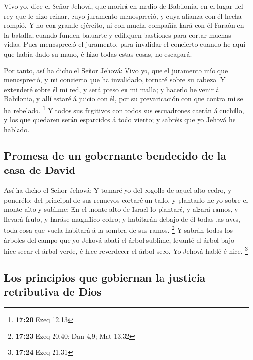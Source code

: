  Vivo yo, dice el Señor Jehová, que morirá en medio de
Babilonia, en el lugar del rey que le hizo reinar, cuyo juramento
menospreció, y cuya alianza con él hecha rompió.  Y no con
grande ejército, ni con mucha compañía hará con él Faraón en la batalla,
cuando funden baluarte y edifiquen bastiones para cortar muchas vidas.
 Pues menospreció el juramento, para invalidar el concierto
cuando he aquí que había dado su mano, é hizo todas estas cosas, no
escapará.

 Por tanto, así ha dicho el Señor Jehová: Vivo yo, que el
juramento mío que menospreció, y mi concierto que ha invalidado, tornaré
sobre su cabeza.  Y extenderé sobre él mi red, y será preso
en mi malla; y hacerlo he venir á Babilonia, y allí estaré á juicio con
él, por su prevaricación con que contra mí se ha rebelado. \footnote{\textbf{17:20}
  Ezeq 12,13}  Y todos sus fugitivos con todos sus
escuadrones caerán á cuchillo, y los que quedaren serán esparcidos á
todo viento; y sabréis que yo Jehová he hablado.

\hypertarget{promesa-de-un-gobernante-bendecido-de-la-casa-de-david}{%
\subsection{Promesa de un gobernante bendecido de la casa de
David}\label{promesa-de-un-gobernante-bendecido-de-la-casa-de-david}}

 Así ha dicho el Señor Jehová: Y tomaré yo del cogollo de
aquel alto cedro, y pondrélo; del principal de sus renuevos cortaré un
tallo, y plantarlo he yo sobre el monte alto y sublime;  En
el monte alto de Israel lo plantaré, y alzará ramos, y llevará fruto, y
haráse magnífico cedro; y habitarán debajo de él todas las aves, toda
cosa que vuela habitará á la sombra de sus ramos. \footnote{\textbf{17:23}
  Ezeq 20,40; Dan 4,9; Mat 13,32}  Y sabrán todos los
árboles del campo que yo Jehová abatí el árbol sublime, levanté el árbol
bajo, hice secar el árbol verde, é hice reverdecer el árbol seco. Yo
Jehová hablé é hice. \footnote{\textbf{17:24} Ezeq 21,31}

\hypertarget{los-principios-que-gobiernan-la-justicia-retributiva-de-dios}{%
\subsection{Los principios que gobiernan la justicia retributiva de
Dios}\label{los-principios-que-gobiernan-la-justicia-retributiva-de-dios}}

